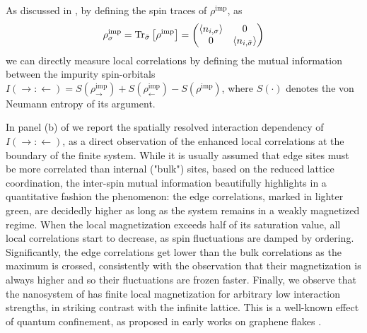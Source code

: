 \documentclass[edipack_sp.tex]{subfiles}
\begin{document}
As  discussed in \cite{BellomiaPhD,BellomiaKMH,Bellomia_intracorr},
by defining the spin traces of $\rho^\mathrm{imp}$, as
\begin{equation}
    \rho^\mathrm{imp}_\sigma = 
    {\rm Tr}_{\bar{\sigma}} \left[\rho^\mathrm{imp}\right] =
    \begin{pmatrix}
        \langle n_{i,\sigma} \rangle & 0 \\
        0 & \langle n_{i,\bar{\sigma}} \rangle
    \end{pmatrix}
\end{equation}
we can directly measure local correlations by defining the mutual information
between the impurity spin-orbitals
$I(\rightarrow:\leftarrow) = 
    S(\rho^\mathrm{imp}_{\rightarrow}) + 
    S(\rho^\mathrm{imp}_{\leftarrow}) -
    S(\rho^\mathrm{imp})$,
where $S(\cdot)$ denotes the von Neumann entropy of its argument.

In panel (b) of  we report the spatially resolved
interaction dependency of $I(\rightarrow:\leftarrow)$, as a direct 
observation of the enhanced local correlations at the boundary of the
finite system. While it is usually assumed that edge sites must be
more correlated than internal ("bulk") sites, based on the reduced
lattice coordination, the inter-spin mutual information beautifully
highlights in a quantitative fashion the phenomenon: the edge correlations,
marked in lighter green, are decidedly higher as long as the system 
remains in a weakly magnetized regime. When the local magnetization
exceeds half of its saturation value, all local correlations start to decrease,
as spin fluctuations are damped by ordering. Significantly, the edge 
correlations get lower than the bulk correlations as the maximum is 
crossed, consistently with the observation that their magnetization
is always higher and so their fluctuations are frozen faster.
Finally, we observe that the nanosystem of  has 
finite local magnetization for arbitrary low interaction strengths,
in striking contrast with the infinite lattice. This is a well-known
effect of quantum confinement, as proposed in early works on graphene
flakes \cite{Valli2016PRB,Valli2018NL}.



\ifSubfilesClassLoaded{
  
}{}
\end{document}
